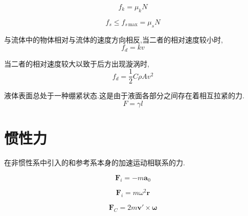 \par {}\jg\jg

\par \quad {}
\begin{equation}
f_k=\mu_kN
\end{equation}

\par \quad {}
\begin{equation}
f_s \le f_{s\,\text{max}}=\mu_sN
\end{equation}

\par {} 与流体中的物体相对与流体的速度方向相反,当二者的相对速度较小时,
\begin{equation}
f_d=kv
\end{equation}
\par 当二者的相对速度较大以致于后方出现漩涡时,
\begin{equation}
f_d=\frac{1}{2}C\rho A v^2
\end{equation}

\par {} 液体表面总处于一种绷紧状态.这是由于液面各部分之间存在着相互拉紧的力.
\begin{equation}
F=\gamma l
\end{equation}

\section{惯性力}
 在非惯性系中引入的和参考系本身的加速运动相联系的力.\jg\jg
{}
\par \quad \dya[平动加速参考系]
\begin{equation}
\bm{F}_i=-m\bm{a}_0
\end{equation}

\par \quad \dya[转动参考系]
\begin{equation}
\bm{F}_i=m\omega^2\bm{r}
\end{equation}

\par \quad \dya[科里奥利力]
\begin{equation}
\bm{F}_C=2m\bm{v'}\times \bm{\omega }
\end{equation}

